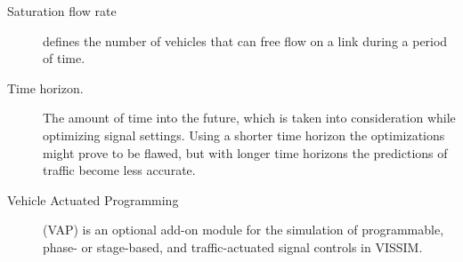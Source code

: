 \begin{description}
\item[Saturation flow rate] defines the number of vehicles that can free flow on a link during a period of time.

\item[Time horizon.] The amount of time into the future, which is taken into consideration while optimizing signal settings. Using a shorter time horizon the optimizations might prove to be flawed, but with longer time horizons the predictions of traffic become less accurate.

\item[Vehicle Actuated Programming] (VAP) is an optional add-on module for the
simulation of programmable, phase- or stage-based, and traffic-actuated signal controls in VISSIM.

\end{description}
